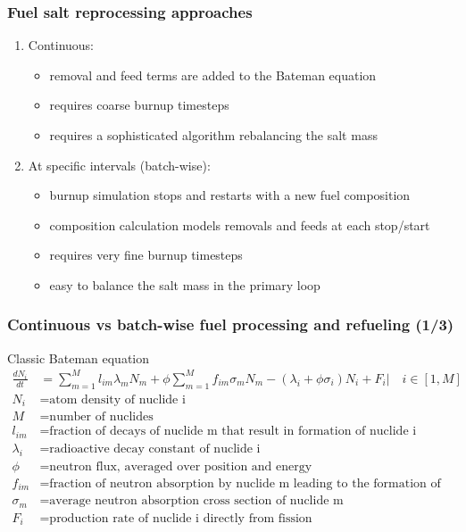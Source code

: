 \begin{frame}
\frametitle{Fuel salt reprocessing approaches}

\begin{enumerate}
	\itemsep2em
	\item Continuous:
	\begin{itemize}
		\item removal and feed terms are added to the Bateman equation
		\item requires coarse burnup timesteps
		\item requires a sophisticated algorithm rebalancing the salt mass 
	\end{itemize}
	\item At specific intervals (batch-wise): 
	\begin{itemize}
		\item burnup simulation stops and restarts with a new fuel composition
                \item composition calculation models removals and feeds at each 
                        stop/start
		\item requires very fine burnup timesteps
		\item easy to balance the salt mass in the primary loop
	\end{itemize}
\end{enumerate}


\end{frame}


\begin{frame}
\frametitle{Continuous vs batch-wise fuel processing  and refueling (1/3)}
\vspace{-7mm}
\begin{block}{Classic Bateman equation}
	\begin{align}
	\frac{dN_i}{dt} &= \sum_{m=1}^{M}l_{im}\lambda_mN_m + 
	\phi\sum_{m=1}^{M}f_{im}\sigma_mN_m - (\lambda_i + \phi\sigma_i)N_i + F_i\Big|\quad{i\in [1,M]} \nonumber\\
	N_i &= \mbox{atom density of nuclide i} \nonumber \\
	M &= \mbox{number of nuclides} \nonumber \\
	l_{im} &= \mbox{fraction of decays of nuclide m that result in formation of 
		nuclide i}\nonumber \\
	\lambda_i &= \mbox{radioactive decay constant of nuclide i} \nonumber \\
	\phi &= \mbox{neutron flux, averaged over position and energy} \nonumber \\
	f_{im} &= \mbox{fraction of neutron absorption by nuclide m leading to the 
		formation of nuclide i} \nonumber \\
	\sigma_m &= \mbox{average neutron absorption cross section of nuclide m} 
	\nonumber \\
	F_i &= \mbox{production rate of nuclide i directly from fission}\nonumber
	\end{align}
\end{block}
\end{frame}


